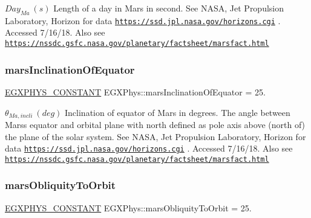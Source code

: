 $ Day_{Ma} \ (s)$ Length of a day in Mars in second. See N\+A\+SA, Jet Propulsion Laboratory, Horizon for data \href{https://ssd.jpl.nasa.gov/horizons.cgi}{\tt https\+://ssd.\+jpl.\+nasa.\+gov/horizons.\+cgi} . Accessed 7/16/18. Also see \href{https://nssdc.gsfc.nasa.gov/planetary/factsheet/marsfact.html}{\tt https\+://nssdc.\+gsfc.\+nasa.\+gov/planetary/factsheet/marsfact.\+html} \mbox{\label{group___e_g_x_phys-_constants-_astrophysics-_solar_system-_mars-_orbit_ga405b70d1daffc03e48c105fb76a204c0}} 
\subsubsection{\texorpdfstring{mars\+Inclination\+Of\+Equator}{marsInclinationOfEquator}}
{\footnotesize\ttfamily \mbox{\hyperlink{group___e_g_x_phys-_constants-_macros_ga76980d288494ce1714c9ac68a95ba702}{E\+G\+X\+P\+H\+Y\+S\+\_\+\+C\+O\+N\+S\+T\+A\+NT}} E\+G\+X\+Phys\+::mars\+Inclination\+Of\+Equator = 25.}

$ \theta_{Ma,incli} \ (deg)$ Inclination of equator of Mars in degrees. The angle between Mars\textquotesingle{}s equator and orbital plane with north defined as pole axis above (north of) the plane of the solar system. See N\+A\+SA, Jet Propulsion Laboratory, Horizon for data \href{https://ssd.jpl.nasa.gov/horizons.cgi}{\tt https\+://ssd.\+jpl.\+nasa.\+gov/horizons.\+cgi} . Accessed 7/16/18. Also see \href{https://nssdc.gsfc.nasa.gov/planetary/factsheet/marsfact.html}{\tt https\+://nssdc.\+gsfc.\+nasa.\+gov/planetary/factsheet/marsfact.\+html} \mbox{\label{group___e_g_x_phys-_constants-_astrophysics-_solar_system-_mars-_orbit_ga4208817f655df6f862b01ea583eee6a9}} 
\subsubsection{\texorpdfstring{mars\+Obliquity\+To\+Orbit}{marsObliquityToOrbit}}
{\footnotesize\ttfamily \mbox{\hyperlink{group___e_g_x_phys-_constants-_macros_ga76980d288494ce1714c9ac68a95ba702}{E\+G\+X\+P\+H\+Y\+S\+\_\+\+C\+O\+N\+S\+T\+A\+NT}} E\+G\+X\+Phys\+::mars\+Obliquity\+To\+Orbit = 25.}

